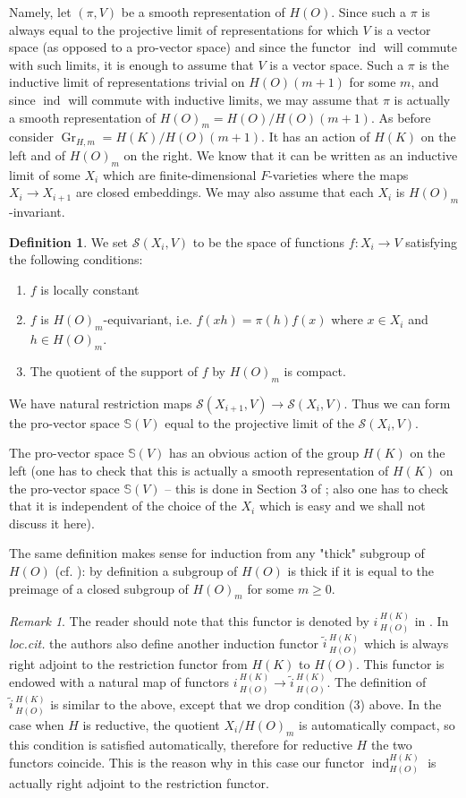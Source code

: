 \documentclass[11pt,a4paper,twoside]{amsart}
\theoremstyle{definition}
\newtheorem{definition}[theorem]{Definition}
\theoremstyle{remark}
\newtheorem{remark}[theorem]{Remark}
\newcommand{\mS}{\mathbb S}
\newcommand{\mcS}{\mathcal S}
\newcommand{\ind}{\operatorname{ind}}
\newcommand{\Gr}{\operatorname{Gr}}
\begin{document}
Namely, let $(\pi,V)$ be a smooth representation of $H(O)$. Since such a $\pi$ is always equal to the projective limit of representations for which $V$ is a vector space (as opposed to a pro-vector space) and since the functor $\ind$ will commute with such limits, it is enough to assume that $V$ is a vector space. Such a $\pi$ is the inductive limit of representations trivial on $H(O)(m+1)$ for some $m$, and since $\ind$ will commute with inductive limits, we may assume that $\pi$ is actually a smooth representation of $H(O)_m=H(O)/H(O)(m+1)$. As before consider $\Gr_{H,m}=H(K)/H(O)(m+1)$. It has an action of $H(K)$ on the left and of $H(O)_m$ on the right.  We know that it can be written as an inductive limit of some $X_i$ which are finite-dimensional $F$-varieties where the maps $X_i\to X_{i+1}$ are closed embeddings. We may also assume that each $X_i$ is $H(O)_m$-invariant.

\begin{definition}\label{indHO}
We set $\mcS(X_i,V)$ to be the space of functions $f:X_i\to V$ satisfying the following conditions:

\begin{enumerate}
\item $f$ is locally constant
\item $f$ is $H(O)_m$-equivariant, i.e. $f(x h)=\pi(h)f(x)$ where $x\in X_i$ and $h\in H(O)_m$.
\item The quotient of the support of $f$ by $H(O)_m$ is compact.
\end{enumerate}
We have natural restriction maps $\mcS(X_{i+1},V)\to\mcS(X_i,V)$.
Thus we can form the pro-vector space $\mS(V)$ equal to the projective limit of the $\mcS(X_i,V)$.
\end{definition}
The pro-vector space $\mS(V)$ has an obvious action of the group $H(K)$ on the left (one has to check that this is actually a smooth representation of $H(K)$ on the pro-vector space $\mathbb S(V)$ -- this is done in Section 3 of \cite{GK}; also one has to check that it is independent of the choice of the $X_i$ which is easy and we shall not discuss it here).

The same definition makes sense for induction from any "thick" subgroup of $H(O)$ (cf. \cite{GK}): by definition a subgroup of $H(O)$ is thick if it is equal to the preimage of a closed subgroup of $H(O)_m$ for some $m\geq 0$.
\begin{remark}
The reader should note that this functor is denoted by $i\, _{H(O)}^{H(K)}$ in \cite{GK}. In {\em loc.cit.} the authors also define another induction functor $\widetilde i\, _{H(O)}^{H(K)}$ which is always right adjoint to the restriction functor from $H(K)$ to $H(O)$. This functor is endowed with a natural map of functors
$i\, _{H(O)}^{H(K)}\to \widetilde i\, _{H(O)}^{H(K)}$. The definition of $\widetilde i\, _{H(O)}^{H(K)}$ is similar to the above, except that we drop condition (3) above. In the case when $H$ is reductive, the quotient $X_i/H(O)_m$ is automatically compact, so this condition is satisfied automatically, therefore for reductive $H$ the two functors coincide. This is the reason why in this case our functor $\ind_{H(O)}^{H(K)}$ is actually right adjoint to the restriction functor.
\end{remark}
\end{document}
